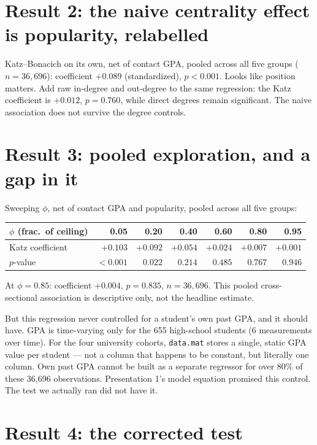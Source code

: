 \documentclass[11pt]{article}
\begin{document}
\section*{Result 2: the naive centrality effect is popularity, relabelled}

Katz--Bonacich on its own, net of contact GPA, pooled across all five groups
($n=36{,}696$): coefficient $+0.089$ (standardized), $p<0.001$. Looks like position
matters. Add raw in-degree and out-degree to the same regression: the Katz coefficient
is $+0.012$, $p=0.760$, while direct degrees remain significant. The naive association
does not survive the degree controls.

\section*{Result 3: pooled exploration, and a gap in it}

Sweeping $\phi$, net of contact GPA and popularity, pooled across all five groups:

\begin{center}
\begin{tabular}{lrrrrrr}
$\phi$ (frac.\ of ceiling) & 0.05 & 0.20 & 0.40 & 0.60 & 0.80 & 0.95 \\
\hline
Katz coefficient & $+0.103$ & $+0.092$ & $+0.054$ & $+0.024$ & $+0.007$ & $+0.001$ \\
$p$-value & $<0.001$ & $0.022$ & $0.214$ & $0.485$ & $0.767$ & $0.946$ \\
\end{tabular}
\end{center}

At $\phi=0.85$: coefficient $+0.004$, $p=0.835$, $n=36{,}696$. This pooled
cross-sectional association is descriptive only, not the headline estimate.

But this regression never controlled for a student's own past GPA, and it should
have. GPA is time-varying only for the 655 high-school students (6 measurements over
time). For the four university cohorts, \texttt{data.mat} stores a single, static GPA
value per student --- not a column that happens to be constant, but literally one
column. Own past GPA cannot be built as a separate regressor for over 80\% of these
36,696 observations. Presentation 1's model equation promised this control. The test
we actually ran did not have it.

\section*{Result 4: the corrected test}
\end{document}
